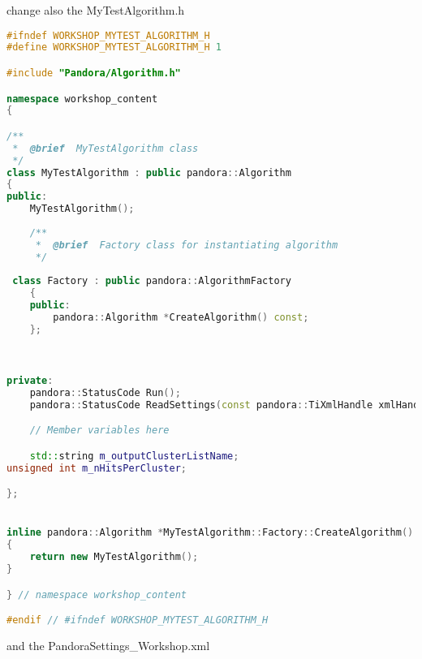 change also the MyTestAlgorithm.h

\begin{lstlisting}[language=C++, label=code:first_cluster.h, caption=MyTestAlgorithm.h]
#ifndef WORKSHOP_MYTEST_ALGORITHM_H
#define WORKSHOP_MYTEST_ALGORITHM_H 1

#include "Pandora/Algorithm.h"

namespace workshop_content
{

/**
 *  @brief  MyTestAlgorithm class
 */
class MyTestAlgorithm : public pandora::Algorithm
{
public:
    MyTestAlgorithm();
	
    /**
     *  @brief  Factory class for instantiating algorithm
     */
  
 class Factory : public pandora::AlgorithmFactory
    {
    public:
        pandora::Algorithm *CreateAlgorithm() const;
    };


	
private:
    pandora::StatusCode Run();
    pandora::StatusCode ReadSettings(const pandora::TiXmlHandle xmlHandle);

    // Member variables here

    std::string m_outputClusterListName;
unsigned int m_nHitsPerCluster;

};


inline pandora::Algorithm *MyTestAlgorithm::Factory::CreateAlgorithm() const
{
    return new MyTestAlgorithm();
}

} // namespace workshop_content

#endif // #ifndef WORKSHOP_MYTEST_ALGORITHM_H
\end{lstlisting}

and the PandoraSettings_Workshop.xml

